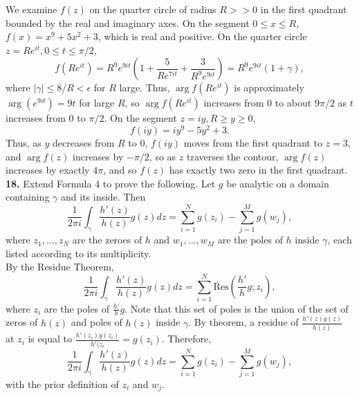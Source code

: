 \documentclass[12pt,letterpaper]{article}
\begin{document}
We examine \(f(z)\) on the quarter circle of radius \(R >> 0\) in the first quadrant bounded by the real and imaginary axes. On the segment \(0 \leq x \leq R\), \(f(x) = x^{9} + 5x^{2} + 3\), which is real and positive. On the quarter circle \(z = Re^{it}, 0 \leq t \leq \pi/2\), \[f(Re^{it}) = R^{9}e^{9it}\left(1 + \frac{5}{Re^{7it}} + \frac{3}{R^{9}e^{9it}}\right) = R^{9}e^{9it}(1+\gamma),\] where \(|\gamma| \leq 8/R < \epsilon\) for \(R\) large. Thus, \(\arg f(Re^{it})\) is approximately \(\arg  (e^{9it}) = 9t\) for large \(R\), so \(\arg f(Re^{it})\) increases from \(0\) to about \(9\pi/2\) as \(t\) increases from \(0\) to \(\pi/2\). On the segment \(z=iy, R \geq y \geq 0\), \[f(iy) = iy^{9} - 5y^{2} + 3.\] Thus, as \(y\) decreases from \(R\) to \(0\), \(f(iy)\) moves from the first quadrant to \(z = 3\), and \(\arg f(z)\) increases by \(-\pi/2\), so as \(z\) traverses the contour, \(\arg f(z)\) increases by exactly \(4\pi\), and so \(f(z)\) has exactly two zero in the first quadrant. \\

\textbf{18.} Extend Formula 4 to prove the following. Let \(g\) be analytic on a domain containing \(\gamma\) and its inside. Then \[\frac{1}{2\pi i} \int_{\gamma} \frac{h'(z)}{h(z)}g(z) dz = \sum_{i = 1}^{N} g(z_{i}) - \sum_{j = 1}^{M} g(w_{j}),\] where \(z_{1}, ..., z_{N}\) are the zeroes of \(h\) and \(w_{1}, ..., w_{M}\) are the poles of \(h\) inside \(\gamma\), each listed according to its multiplicity. \\

By the Residue Theorem, \[\frac{1}{2\pi i} \int_{\gamma} \frac{h'(z)}{h(z)} g(z) dz = \sum_{i = 1}^{N} \text{Res}\left(\frac{h'}{h}g ; z_{i}\right),\] where \(z_{i}\) are the poles of \(\frac{h'}{h}g\). Note that this set of poles is the union of the set of zeros of \(h(z)\) and poles of \(h(z)\) inside \(\gamma\). By theorem, a residue of \(\frac{h'(z)g(z)}{h(z)}\) at \(z_{i}\) is equal to \(\frac{h'(z_{i})g(z_{i})}{h'(z_{i}} = g(z_{i})\). Therefore, \[\frac{1}{2\pi i} \int_{\gamma} \frac{h'(z)}{h(z)}g(z) dz = \sum_{i = 1}^{N} g(z_{i}) - \sum_{j = 1}^{M} g(w_{j}),\] with the prior definition of \(z_{i}\) and \(w_{j}\).
\end{document}
